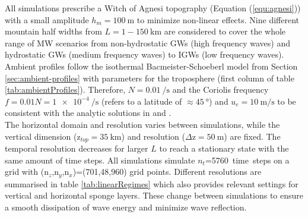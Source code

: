 All simulations prescribe a Witch of Agnesi topography (Equation (\ref{equ:agnesi})) with a small amplitude $h_m = \SI{100}{\meter}$ to minimize non-linear effects. Nine different mountain half widths from $L = 1-\SI{150}{\kilo\meter}$ are considered to cover the whole range of MW scenarios from non-hydrostatic GWs (high frequency waves) and hydrostatic GWs (medium frequency waves) to IGWs (low frequency waves). Ambient profiles follow the isothermal Bacmeister-Schoeberl model from Section \ref{sec:ambient-profiles} with parameters for the troposphere (first column of table \ref{tab:ambientProfiles}). Therefore, $N=\SI{0.01}{\per\second}$ and the Coriolis frequency $f = 0.01 N = \SI{1e-4}{\per\second}$ (refers to a latitude of $\approx \SI{45}{\degree}$) and $u_e =\SI{10}{\meter\per\second}$ to be consistent with the analytic solutions in \textcite[]{queney_problem_1948} and \textcite[]{gill_atmosphere-ocean_1982}. \\
The horizontal domain and resolution varies between simulations, while the vertical dimension (z$_{top}=\SI{35}{\kilo\meter}$) and resolution ($\Delta$z$=\SI{50}{\meter}$) are fixed. The temporal resolution decreases for larger $L$ to reach a stationary state with the same amount of time steps. All simulations simulate $n_t$=\SI{5760}{time steps} on a grid with (n$_z$,n$_y$,n$_x$)=(701,48,960) grid points. Different resolutions are summarised in table \ref{tab:linearRegimes} which also provides relevant settings for vertical and horizontal sponge layers. These change between simulations to ensure a smooth dissipation of wave energy and minimize wave reflection. \\
%
